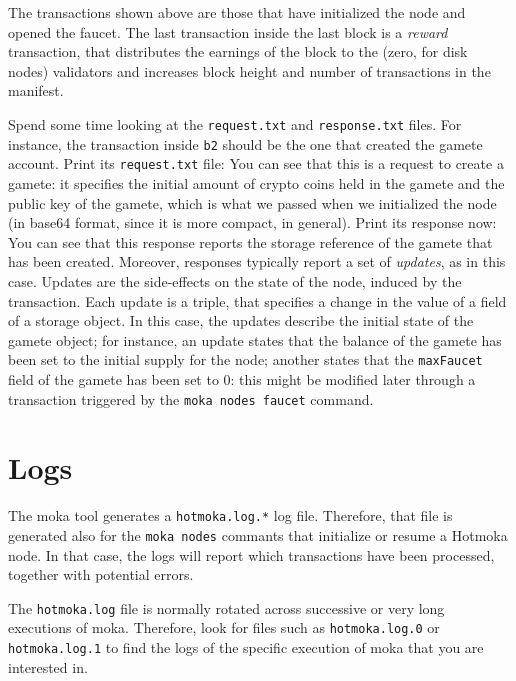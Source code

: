 The transactions shown above are those that have initialized the node and
opened the faucet. The last transaction inside the last block is a \emph{reward}
transaction, that distributes the earnings of the block to the (zero, for disk nodes) validators
and increases block height and number of transactions in the manifest.

Spend some time looking at the \texttt{request.txt} and \texttt{response.txt} files.
For instance, the transaction inside \texttt{b2} should be the one that created the gamete
account. Print its \texttt{request.txt} file:
%
%
You can see that this is a request to create a gamete: it specifies the initial amount of crypto coins
held in the gamete and the public key of the gamete, which is what we passed when we initialized the node
(in base64 format, since it is more compact, in general). Print its response now:
%
%
You can see that this response reports the storage reference of the gamete that has been created.
Moreover, responses typically report a set of \emph{updates}, as in this case.
Updates are the side-effects on the state of the node,
induced by the transaction. Each update is a triple, that specifies a change in the value
of a field of a storage object. In this case, the updates describe the initial
state of the gamete object; for instance, an update states that
the balance of the gamete has been set to the initial supply for the node;
another states that the \texttt{maxFaucet} field of the gamete has been set to 0: this might be modified
later through a transaction triggered by the \texttt{moka nodes faucet} command.

\section{Logs}\label{sec:logs}

The moka tool generates a \texttt{hotmoka.log.*}
log file. Therefore, that file is generated also
for the \texttt{moka nodes} commants that initialize or resume a Hotmoka node.
In that case, the logs will report which transactions have been
processed, together with potential errors.
%
\begin{commentbox}
The \texttt{hotmoka.log} file is normally rotated across successive or very long executions of moka.
Therefore, look for files such as \texttt{hotmoka.log.0} or \texttt{hotmoka.log.1} to find the logs of the
specific execution of moka that you are interested in.
\end{commentbox}

